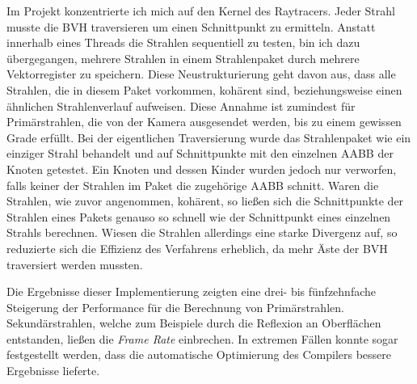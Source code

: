 \documentclass[crop=false]{standalone}
\begin{document}
      Im Projekt konzentrierte ich mich auf den Kernel des Raytracers.
      Jeder Strahl musste die BVH traversieren um einen Schnittpunkt zu ermitteln.
      Anstatt innerhalb eines Threads die Strahlen sequentiell zu testen, bin ich dazu übergegangen, mehrere Strahlen in einem Strahlenpaket durch mehrere Vektorregister zu speichern.
      Diese Neustrukturierung geht davon aus, dass alle Strahlen, die in diesem Paket vorkommen, kohärent sind, beziehungsweise einen ähnlichen Strahlenverlauf aufweisen.
      Diese Annahme ist zumindest für Primärstrahlen, die von der Kamera ausgesendet werden, bis zu einem gewissen Grade erfüllt.
      Bei der eigentlichen Traversierung wurde das Strahlenpaket wie ein einziger Strahl behandelt und auf Schnittpunkte mit den einzelnen AABB der Knoten getestet.
      Ein Knoten und dessen Kinder wurden jedoch nur verworfen, falls keiner der Strahlen im Paket die zugehörige AABB schnitt.
      Waren die Strahlen, wie zuvor angenommen, kohärent, so ließen sich die Schnittpunkte der Strahlen eines Pakets genauso so schnell wie der Schnittpunkt eines einzelnen Strahls berechnen.
      Wiesen die Strahlen allerdings eine starke Divergenz auf, so reduzierte sich die Effizienz des Verfahrens erheblich, da mehr Äste der BVH traversiert werden mussten.

      Die Ergebnisse dieser Implementierung zeigten eine drei- bis fünfzehnfache Steigerung der Performance für die Berechnung von Primärstrahlen.
      Sekundärstrahlen, welche zum Beispiele durch die Reflexion an Oberflächen entstanden, ließen die \textit{Frame Rate} einbrechen.
      In extremen Fällen konnte sogar festgestellt werden, dass die automatische Optimierung des Compilers bessere Ergebnisse lieferte.
\end{document}
